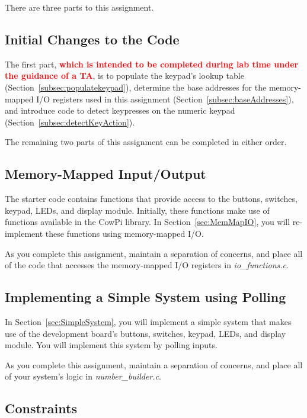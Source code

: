 There are three parts to this assignment.

\subsection{Initial Changes to the Code}

The first part, \textbf{\textcolor{red}{which is intended to be completed during lab time under the guidance of a TA}},
is to populate the keypad's lookup table (Section~\ref{subsec:populatekeypad}),
determine the base addresses for the memory-mapped I/O registers used in this assignment (Section~\ref{subsec:baseAddresses}),
and introduce code to detect keypresses on the numeric keypad (Section~\ref{subsec:detectKeyAction}).

The remaining two parts of this assignment can be completed in either order.

\subsection{Memory-Mapped Input/Output}

The starter code contains functions that provide access to the buttons, switches, keypad, LEDs, and display module.
Initially, these functions make use of functions available in the CowPi library.
In Section~\ref{sec:MemMapIO}, you will re-implement these functions using memory-mapped I/O\@.

As you complete this assignment, maintain a separation of concerns,
and place all of the code that accesses the memory-mapped I/O registers in \textit{io\_functions.c}.

\subsection{Implementing a Simple System using Polling}

In Section~\ref{sec:SimpleSystem}, you will implement a simple system that makes use of the development board's buttons, switches, keypad, LEDs, and display module.
You will implement this system by polling inputs.

As you complete this assignment, maintain a separation of concerns,
and  place all of your system's logic in \textit{number\_builder.c}.


\subsection{Constraints} \label{subsec:constraints}

